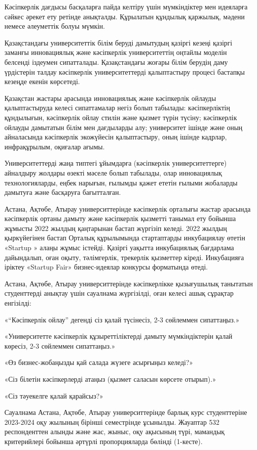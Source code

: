 Кәсіпкерлік дағдысы басқаларға пайда келтіру үшін мүмкіндіктер мен
идеяларға сәйкес әрекет ету ретінде анықталды. Құрылатын құндылық
қаржылық, мәдени немесе әлеуметтік болуы мүмкін.

Қазақстандағы университеттік білім беруді дамытудың қазіргі кезеңі
қазіргі заманғы инновациялық және кәсіпкерлік университеттің оңтайлы
моделін белсенді іздеумен сипатталады. Қазақстандағы жоғары білім
берудің даму үрдістерін талдау кәсіпкерлік университеттерді қалыптастыру
процесі бастапқы кезеңде екенін көрсетеді.

Қазақстан жастары арасында инновациялық және кәсіпкерлік ойлауды
қалыптастыруда келесі сипаттамалар негіз болып табылады: кәсіпкерліктің
құндылығын, кәсіпкерлік ойлау стилін және қызмет түрін түсіну;
кәсіпкерлік ойлауды дамытатын білім мен дағдыларды алу; университет
ішінде және оның айналасында кәсіпкерлік экожүйесін қалыптастыру, оның
ішінде кадрлар, инфрақұрылым, оқиғалар ағымы.

Университеттерді жаңа типтегі ұйымдарға (кәсіпкерлік университеттерге)
айналдыру жолдары өзекті мәселе болып табылады, олар инновациялық
технологияларды, еңбек нарығын, ғылымды қажет ететін ғылыми жобаларды
дамытуға және басқаруға бағытталған.

Астана, Ақтөбе, Атырау университтерінде кәсіпкерлік орталығы жастар
арасында кәсіпкерлік ортаны дамыту және кәсіпкерлік қызметті танымал ету
бойынша жұмысты 2022 жылдың қаңтарынан бастап жүргізіп келеді. 2022
жылдың қыркүйегінен бастап Орталық құрылымында стартаптарды инкубациялау
өтетін «Startup » алаңы жұмыс істейді. Қазіргі уақытта инкубациялық
бағдарлама дайындалып, оған оқыту, тәлімгерлік, трекерлік қызметтер
кіреді. Инкубацияға іріктеу «Startup Fair» бизнес-идеялар конкурсы
форматында өтеді.

Астана, Ақтөбе, Атырау университтерінде кәсіпкерлікке қызығушылық
танытатын студенттерді анықтау үшін сауалнама жүргізілді, оған келесі
ашық сұрақтар енгізілді:

«``Кәсіпкерлік ойлау'' дегенді сіз қалай түсінесіз, 2-3 сөйлеммен
сипаттаңыз.»

«Университетте кәсіпкерлік құзыреттіліктерді дамыту мүмкіндіктерін қалай
көресіз, 2-3 сөйлеммен сипаттаңыз.»

«Өз бизнес-жобаңызды қай салада жүзеге асырғыңыз келеді?»

«Сіз білетін кәсіпкерлерді атаңыз (қызмет саласын көрсете отырып).»

«Сіз тәуекелге қалай қарайсыз?»

Сауалнама Астана, Ақтөбе, Атырау университтерінде барлық курс
студенттеріне 2023-2024 оқу жылының бірінші семестрінде ұсынылды.
Жауаптар 532 респонденттен алынды және жас, жыныс, оқу ақысының түрі,
мамандық критерийлері бойынша әртүрлі пропорцияларда бөлінді (1-кесте).


